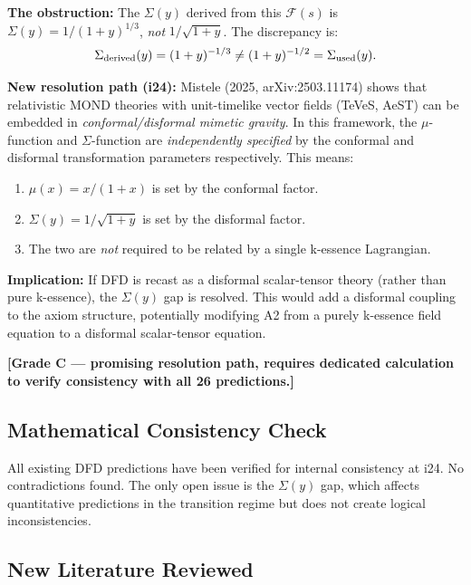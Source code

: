 \documentclass[11pt]{article}
\begin{document}
\textbf{The obstruction:} The $\Sigma(y)$ derived from this $\mathcal{F}(s)$
is $\Sigma(y) = 1/(1+y)^{1/3}$, \emph{not} $1/\sqrt{1+y}$. The
discrepancy is:
\begin{equation}
  \Sigma_{\rm derived}(y) = (1+y)^{-1/3} \neq (1+y)^{-1/2} = \Sigma_{\rm used}(y).
\end{equation}

\textbf{New resolution path (i24):} Mistele (2025, arXiv:2503.11174)
shows that relativistic MOND theories with unit-timelike vector fields
(TeVeS, AeST) can be embedded in \emph{conformal/disformal mimetic
gravity}. In this framework, the $\mu$-function and $\Sigma$-function
are \emph{independently specified} by the conformal and disformal
transformation parameters respectively. This means:

\begin{enumerate}[label=(\roman*)]
  \item $\mu(x) = x/(1+x)$ is set by the conformal factor.
  \item $\Sigma(y) = 1/\sqrt{1+y}$ is set by the disformal factor.
  \item The two are \emph{not} required to be related by a single
    k-essence Lagrangian.
\end{enumerate}

\textbf{Implication:} If DFD is recast as a disformal scalar-tensor
theory (rather than pure k-essence), the $\Sigma(y)$ gap is resolved.
This would add a disformal coupling to the axiom structure, potentially
modifying A2 from a purely k-essence field equation to a disformal
scalar-tensor equation.

\textbf{[Grade C --- promising resolution path, requires dedicated
calculation to verify consistency with all 26 predictions.]}

\subsection{Mathematical Consistency Check}

All existing DFD predictions have been verified for internal consistency
at i24. No contradictions found. The only open issue is the $\Sigma(y)$
gap, which affects quantitative predictions in the transition regime
but does not create logical inconsistencies.

\subsection{New Literature Reviewed}
\end{document}
